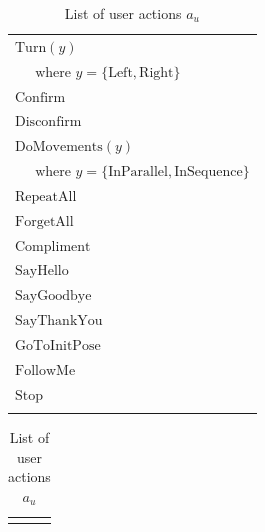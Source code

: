 \begin{table}[h]
\begin{minipage}[b]{80mm}
\begin{footnotesize}
\begin{tabular}{p{60mm}}
$\mathrm{Turn}(y) $ \\ $\ \ \ \ \ \text{ where } y = \{\mathrm{Left,Right}\}$  \\[0.5mm] \hdashline \vspace{-2.5mm} 
$\mathrm{Confirm}$ \\[0.5mm] \hdashline \vspace{-2.5mm} 
$\mathrm{Disconfirm}$ \\[0.5mm] \hdashline \vspace{-2.5mm} 
$\mathrm{DoMovements}(y) $ \\ $ \ \ \ \ \  \text{ where } y = \{\mathrm{InParallel,InSequence}\}$\\[0.5mm] \hdashline \vspace{-2.5mm} 
$\mathrm{RepeatAll}$ \\[0.5mm] \hdashline \vspace{-2.5mm} 
$\mathrm{ForgetAll}$ \\[0.5mm] \hdashline \vspace{-2.5mm} 
$\mathrm{Compliment}$ \\[0.5mm] \hdashline \vspace{-2.5mm} 
$\mathrm{SayHello}$ \\[0.5mm] \hdashline \vspace{-2.5mm} 
$\mathrm{SayGoodbye}$ \\[0.5mm] \hdashline \vspace{-2.5mm} 
$\mathrm{SayThankYou}$ \\[0.5mm] \hdashline \vspace{-2.5mm} 
$\mathrm{GoToInitPose}$ \\[0.5mm] \hdashline \vspace{-2.5mm} 
$\mathrm{FollowMe}$ \\[0.5mm] \hdashline \vspace{-2.5mm} 
$\mathrm{Stop}$ \\[0.5mm] \hdashline  
\end{tabular}
\end{footnotesize}
    \caption{List of user actions $a_u$} 
\label{table:userdas}
\end{minipage}
\begin{minipage}[b]{80mm}
\begin{footnotesize}
\begin{tabular}{p{60mm}} \hdashline \vspace{-2.5mm} 

\end{tabular}
\end{footnotesize}
\end{minipage}
\end{table}
